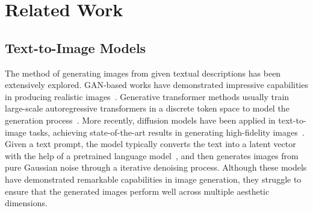 \section{Related Work}
\label{sec:Related Work}

\subsection{Text-to-Image Models} 
The method of generating images from given textual descriptions has been extensively explored. GAN-based works have demonstrated impressive capabilities in producing realistic images~\cite{tao2022df,xu2018attngan,zhang2021cross}. Generative transformer methods usually train large-scale autoregressive transformers in a discrete token space to model the generation process~\cite{ramesh2021zero,yu2022scaling,yu2023scaling}. More recently, diffusion models have been applied in text-to-image tasks, achieving state-of-the-art results in generating high-fidelity images~\cite{rombach2022high,podell2023sdxl,esser2024scaling}. Given a text prompt, the model typically converts the text into a latent vector with the help of a pretrained language model~\cite{radford2021learning}, and then generates images from pure Gaussian noise through a iterative denoising process. Although these models have demonstrated remarkable capabilities in image generation, they struggle to ensure that the generated images perform well across multiple aesthetic dimensions.



